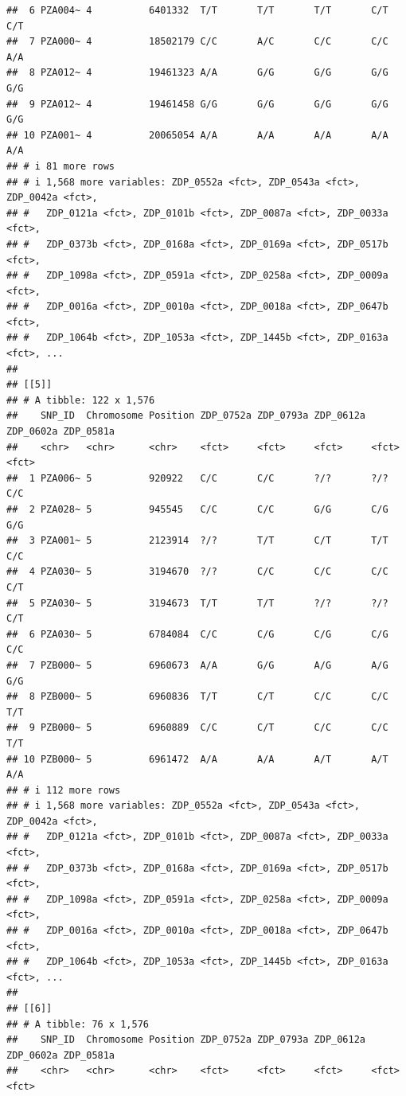 \documentclass[
]{article}
\begin{document}
\begin{verbatim}
##  6 PZA004~ 4          6401332  T/T       T/T       T/T       C/T       C/T      
##  7 PZA000~ 4          18502179 C/C       A/C       C/C       C/C       A/A      
##  8 PZA012~ 4          19461323 A/A       G/G       G/G       G/G       G/G      
##  9 PZA012~ 4          19461458 G/G       G/G       G/G       G/G       G/G      
## 10 PZA001~ 4          20065054 A/A       A/A       A/A       A/A       A/A      
## # i 81 more rows
## # i 1,568 more variables: ZDP_0552a <fct>, ZDP_0543a <fct>, ZDP_0042a <fct>,
## #   ZDP_0121a <fct>, ZDP_0101b <fct>, ZDP_0087a <fct>, ZDP_0033a <fct>,
## #   ZDP_0373b <fct>, ZDP_0168a <fct>, ZDP_0169a <fct>, ZDP_0517b <fct>,
## #   ZDP_1098a <fct>, ZDP_0591a <fct>, ZDP_0258a <fct>, ZDP_0009a <fct>,
## #   ZDP_0016a <fct>, ZDP_0010a <fct>, ZDP_0018a <fct>, ZDP_0647b <fct>,
## #   ZDP_1064b <fct>, ZDP_1053a <fct>, ZDP_1445b <fct>, ZDP_0163a <fct>, ...
## 
## [[5]]
## # A tibble: 122 x 1,576
##    SNP_ID  Chromosome Position ZDP_0752a ZDP_0793a ZDP_0612a ZDP_0602a ZDP_0581a
##    <chr>   <chr>      <chr>    <fct>     <fct>     <fct>     <fct>     <fct>    
##  1 PZA006~ 5          920922   C/C       C/C       ?/?       ?/?       C/C      
##  2 PZA028~ 5          945545   C/C       C/C       G/G       C/G       G/G      
##  3 PZA001~ 5          2123914  ?/?       T/T       C/T       T/T       C/C      
##  4 PZA030~ 5          3194670  ?/?       C/C       C/C       C/C       C/T      
##  5 PZA030~ 5          3194673  T/T       T/T       ?/?       ?/?       C/T      
##  6 PZA030~ 5          6784084  C/C       C/G       C/G       C/G       C/C      
##  7 PZB000~ 5          6960673  A/A       G/G       A/G       A/G       G/G      
##  8 PZB000~ 5          6960836  T/T       C/T       C/C       C/C       T/T      
##  9 PZB000~ 5          6960889  C/C       C/T       C/C       C/C       T/T      
## 10 PZB000~ 5          6961472  A/A       A/A       A/T       A/T       A/A      
## # i 112 more rows
## # i 1,568 more variables: ZDP_0552a <fct>, ZDP_0543a <fct>, ZDP_0042a <fct>,
## #   ZDP_0121a <fct>, ZDP_0101b <fct>, ZDP_0087a <fct>, ZDP_0033a <fct>,
## #   ZDP_0373b <fct>, ZDP_0168a <fct>, ZDP_0169a <fct>, ZDP_0517b <fct>,
## #   ZDP_1098a <fct>, ZDP_0591a <fct>, ZDP_0258a <fct>, ZDP_0009a <fct>,
## #   ZDP_0016a <fct>, ZDP_0010a <fct>, ZDP_0018a <fct>, ZDP_0647b <fct>,
## #   ZDP_1064b <fct>, ZDP_1053a <fct>, ZDP_1445b <fct>, ZDP_0163a <fct>, ...
## 
## [[6]]
## # A tibble: 76 x 1,576
##    SNP_ID  Chromosome Position ZDP_0752a ZDP_0793a ZDP_0612a ZDP_0602a ZDP_0581a
##    <chr>   <chr>      <chr>    <fct>     <fct>     <fct>     <fct>     <fct>    

\end{verbatim}
\end{document}
